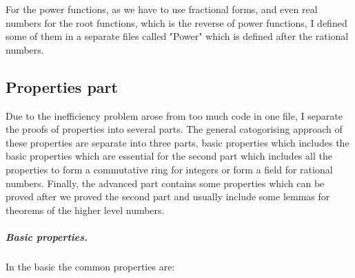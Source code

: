 \documentclass{article}
\theoremstyle{definition}
\begin{document}
For the power functions, as we have to use fractional forms, and even real numbers for the root functions, which is the reverse of power functions, I defined some of them in a separate files called "Power" which is defined after the rational numbers.


\subsection{Properties part}

Due to the inefficiency problem arose from too much code in one file, I separate the proofs of properties into several parts. The general catogorising approach of these properties are separate into three parts, basic properties which includes the basic properties which are essential for the second part which includes all the properties to form a commutative ring for integers or form a field for rational numbers. Finally, the advanced part contains some properties which can be proved after we proved the second part and usually include some lemmas for theorems of the higher level numbers.

\subparagraph{Basic properties.} In the basic the common properties are:
\end{document}
